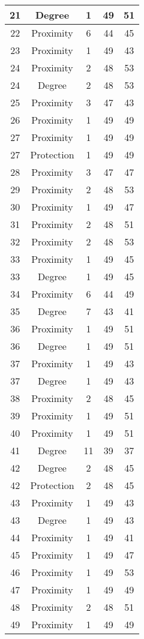\documentclass[results.tex]{subfiles}
\begin{document}
\begin{center}
\begin{tabular}{| c || c | c | c | c |}
    \hline
    21 & Degree & 1 & 49 & 51 \\ 
    \hline
    22 & Proximity & 6 & 44 & 45 \\ 
    \hline
    23 & Proximity & 1 & 49 & 43 \\ 
    \hline
    24 & Proximity & 2 & 48 & 53 \\ 
    \hline
    24 & Degree & 2 & 48 & 53 \\ 
    \hline
    25 & Proximity & 3 & 47 & 43 \\ 
    \hline
    26 & Proximity & 1 & 49 & 49 \\ 
    \hline
    27 & Proximity & 1 & 49 & 49 \\ 
    \hline
    27 & Protection & 1 & 49 & 49 \\ 
    \hline
    28 & Proximity & 3 & 47 & 47 \\ 
    \hline
    29 & Proximity & 2 & 48 & 53 \\ 
    \hline
    30 & Proximity & 1 & 49 & 47 \\ 
    \hline
    31 & Proximity & 2 & 48 & 51 \\ 
    \hline
    32 & Proximity & 2 & 48 & 53 \\ 
    \hline
    33 & Proximity & 1 & 49 & 45 \\ 
    \hline
    33 & Degree & 1 & 49 & 45 \\ 
    \hline
    34 & Proximity & 6 & 44 & 49 \\ 
    \hline
    35 & Degree & 7 & 43 & 41 \\ 
    \hline
    36 & Proximity & 1 & 49 & 51 \\ 
    \hline
    36 & Degree & 1 & 49 & 51 \\ 
    \hline
    37 & Proximity & 1 & 49 & 43 \\ 
    \hline
    37 & Degree & 1 & 49 & 43 \\ 
    \hline
    38 & Proximity & 2 & 48 & 45 \\ 
    \hline
    39 & Proximity & 1 & 49 & 51 \\ 
    \hline
    40 & Proximity & 1 & 49 & 51 \\ 
    \hline
    41 & Degree & 11 & 39 & 37 \\ 
    \hline
    42 & Degree & 2 & 48 & 45 \\ 
    \hline
    42 & Protection & 2 & 48 & 45 \\ 
    \hline
    43 & Proximity & 1 & 49 & 43 \\ 
    \hline
    43 & Degree & 1 & 49 & 43 \\ 
    \hline
    44 & Proximity & 1 & 49 & 41 \\ 
    \hline
    45 & Proximity & 1 & 49 & 47 \\ 
    \hline
    46 & Proximity & 1 & 49 & 53 \\ 
    \hline
    47 & Proximity & 1 & 49 & 49 \\ 
    \hline
    48 & Proximity & 2 & 48 & 51 \\ 
    \hline
    49 & Proximity & 1 & 49 & 49 \\ 
    \hline   \end{tabular}
\end{center}
\end{document}
